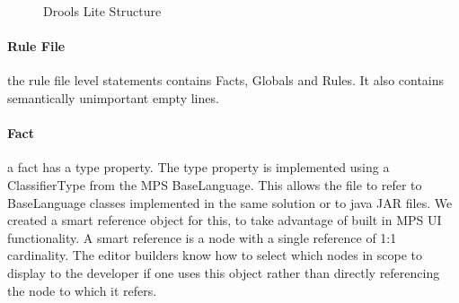 \begin{figure}[htbp]
    \centering
    \caption{Drools Lite Structure}
    \label{fig:DroolsLiteDiagram}
\end{figure}
 
\paragraph{Rule File} the rule file level statements contains Facts, Globals and Rules.
It also contains semantically unimportant empty lines.

\paragraph{Fact} a fact has a type property. 
The type property is implemented using a ClassifierType from the MPS BaseLanguage.
This allows the file to refer to BaseLanguage classes implemented in the same solution or to java JAR files.
We created a smart reference object for this, to take advantage of built in MPS UI functionality.
A smart reference is a node with a single reference of 1:1 cardinality.
The editor builders know how to select which nodes in scope to display to the developer if one uses this object rather than directly referencing the node to which it refers.

